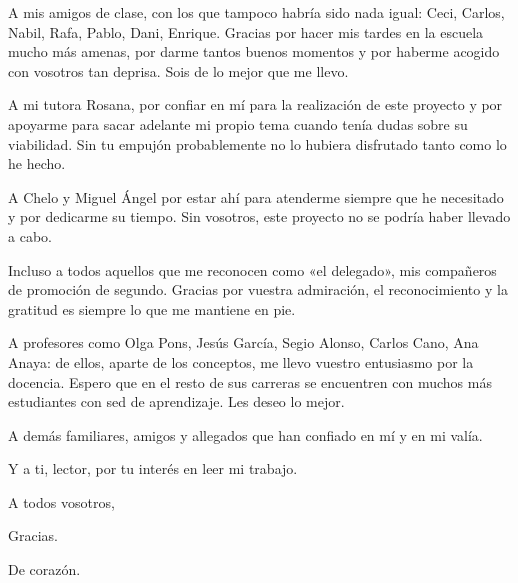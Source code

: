 A mis amigos de clase, con los que tampoco habría sido nada igual: Ceci, Carlos, Nabil, Rafa, Pablo, Dani, Enrique. Gracias por hacer mis tardes en la escuela mucho más amenas, por darme tantos buenos momentos y por haberme acogido con vosotros tan deprisa. Sois de lo mejor que me llevo.

A mi tutora Rosana, por confiar en mí para la realización de este proyecto y por apoyarme para sacar adelante mi propio tema cuando tenía dudas sobre su viabilidad. Sin tu empujón probablemente no lo hubiera disfrutado tanto como lo he hecho.

A Chelo y Miguel Ángel por estar ahí para atenderme siempre que he necesitado y por dedicarme su tiempo. Sin vosotros, este proyecto no se podría haber llevado a cabo.

Incluso a todos aquellos que me reconocen como «el delegado», mis compañeros de promoción de segundo. Gracias por vuestra admiración, el reconocimiento y la gratitud es siempre lo que me mantiene en pie.

A profesores como Olga Pons, Jesús García, Segio Alonso, Carlos Cano, Ana Anaya: de ellos, aparte de los conceptos, me llevo vuestro entusiasmo por la docencia. Espero que en el resto de sus carreras se encuentren con muchos más estudiantes con sed de aprendizaje. Les deseo lo mejor.

A demás familiares, amigos y allegados que han confiado en mí y en mi valía.

Y a ti, lector, por tu interés en leer mi trabajo.

A todos vosotros,

Gracias.

De corazón.


